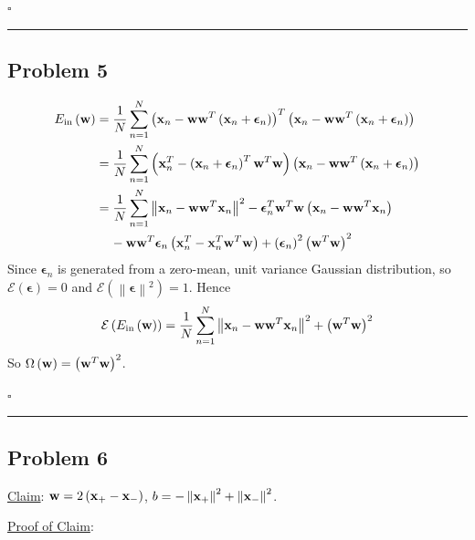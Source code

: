 \documentclass[12pt]{article}
\newcommand*{\QEDB}{\hfill\ensuremath{\square}}
\newcommand{\ParTh}[1]{\left(#1\right)}
\newcommand{\BF}[1]{{\bf#1}}
\newcommand{\VecAbsVal}[1]{\left\|#1\right\|}
\newcommand{\horrule}[1]{\rule{\linewidth}{#1}}
\begin{document}
\QEDB

\horrule{0.5pt}

\subsection*{Problem 5}

\begin{align}
E_{\text{in}}\ParTh{\BF{w}}&=\dfrac{1}{N}\sum_{n=1}^{N}\ParTh{\BF{x}_n-\BF{w}\BF{w}^T\ParTh{\BF{x}_n+\bm{\epsilon}_n}}^T\ParTh{\BF{x}_n-\BF{w}\BF{w}^T\ParTh{\BF{x}_n+\bm{\epsilon}_n}}\\
&=\dfrac{1}{N}\sum_{n=1}^{N}\ParTh{\BF{x}^T_n-\ParTh{\BF{x}_n+\bm{\epsilon}_n}^T\BF{w}^T\BF{w}}\ParTh{\BF{x}_n-\BF{w}\BF{w}^T\ParTh{\BF{x}_n+\bm{\epsilon}_n}}\\
\nonumber
&=\dfrac{1}{N}\sum_{n=1}^{N}\VecAbsVal{\BF{x}_n-\BF{w}\BF{w}^T\BF{x}_n}^2-\bm{\epsilon}^T_n\BF{w}^T\BF{w}\ParTh{\BF{x}_n-\BF{w}\BF{w}^T\BF{x}_n}\\
&\hspace{4mm}-\BF{w}\BF{w}^T\bm{\epsilon}_n\ParTh{\BF{x}^T_n-\BF{x}^T_n\BF{w}^T\BF{w}}+\ParTh{\bm{\epsilon}_n}^2\ParTh{\BF{w}^T\BF{w}}^2
\end{align}
Since $\bm{\epsilon}_n$ is generated from a zero-mean, unit variance Gaussian distribution, so $\mathcal{E}\ParTh{\bm{\epsilon}}=0$ and $\mathcal{E}\ParTh{\VecAbsVal{\bm{\epsilon}}^2}=1$. Hence
\begin{align}
\mathcal{E}\ParTh{E_{\text{in}}\ParTh{\BF{w}}}=\dfrac{1}{N}\sum_{n=1}^{N}\VecAbsVal{\BF{x}_n-\BF{w}\BF{w}^T\BF{x}_n}^2+\ParTh{\BF{w}^T\BF{w}}^2
\end{align}
So $\Omega\ParTh{\BF{w}}=\ParTh{\BF{w}^T\BF{w}}^2$.

\QEDB

\horrule{0.5pt}

\subsection*{Problem 6}

\underline{Claim}: $\BF{w}=2\ParTh{\BF{x}_+-\BF{x}_-}$, $b=-\VecAbsVal{\BF{x}_+}^2+\VecAbsVal{\BF{x}_-}^2$.

\underline{Proof of Claim}:
\end{document}

